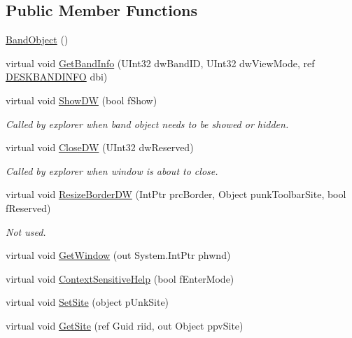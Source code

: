 \subsection*{Public Member Functions}
\begin{DoxyCompactItemize}
\item 
\hyperlink{class_band_objects_lib_1_1_band_object_a1336b25f1845a68310c09cb1d9bffeeb}{Band\+Object} ()
\item 
virtual void \hyperlink{class_band_objects_lib_1_1_band_object_a9fca07566cf5b3eb542dc5c81bbddf20}{Get\+Band\+Info} (U\+Int32 dw\+Band\+I\+D, U\+Int32 dw\+View\+Mode, ref \hyperlink{struct_band_objects_lib_1_1_d_e_s_k_b_a_n_d_i_n_f_o}{D\+E\+S\+K\+B\+A\+N\+D\+I\+N\+F\+O} dbi)
\item 
virtual void \hyperlink{class_band_objects_lib_1_1_band_object_a155824f6b865bac1717dd1caf65ce531}{Show\+D\+W} (bool f\+Show)
\begin{DoxyCompactList}\small\item\em Called by explorer when band object needs to be showed or hidden. \end{DoxyCompactList}\item 
virtual void \hyperlink{class_band_objects_lib_1_1_band_object_adbdd4af40bebe02676c4b81a1e53e57a}{Close\+D\+W} (U\+Int32 dw\+Reserved)
\begin{DoxyCompactList}\small\item\em Called by explorer when window is about to close. \end{DoxyCompactList}\item 
virtual void \hyperlink{class_band_objects_lib_1_1_band_object_a55bc80358824a8c353aedfe502aebeb7}{Resize\+Border\+D\+W} (Int\+Ptr prc\+Border, Object punk\+Toolbar\+Site, bool f\+Reserved)
\begin{DoxyCompactList}\small\item\em Not used. \end{DoxyCompactList}\item 
virtual void \hyperlink{class_band_objects_lib_1_1_band_object_ac6cbebb8f544d3d55c94f9cdf8d38dc3}{Get\+Window} (out System.\+Int\+Ptr phwnd)
\item 
virtual void \hyperlink{class_band_objects_lib_1_1_band_object_a69944adc432e6d75e0a20df1fc2dc5f7}{Context\+Sensitive\+Help} (bool f\+Enter\+Mode)
\item 
virtual void \hyperlink{class_band_objects_lib_1_1_band_object_a52961d4fe1bda815760cc0614e869608}{Set\+Site} (object p\+Unk\+Site)
\item 
virtual void \hyperlink{class_band_objects_lib_1_1_band_object_a8ca3bcbffaefc7196c9e7b52c38a058a}{Get\+Site} (ref Guid riid, out Object ppv\+Site)

\end{DoxyCompactItemize}
